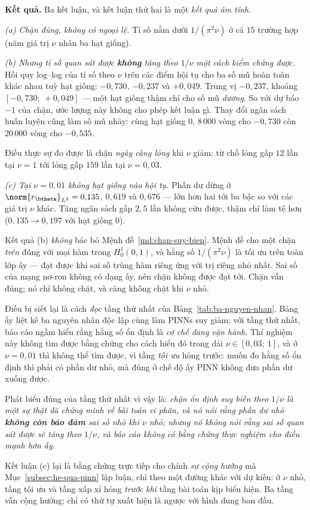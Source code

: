 \textbf{Kết quả.} Ba kết luận, và kết luận thứ hai là một \emph{kết quả âm tính}.

\emph{(a) Chặn đúng, không có ngoại lệ.} Tỉ số nằm dưới $1/(\pi^2\nu)$ ở cả
$15$ trường hợp (năm giá trị $\nu$ nhân ba hạt giống).

\emph{(b) Nhưng tỉ số quan sát được \textbf{không} tăng theo $1/\nu$ một cách
kiểm chứng được.} Hồi quy log--log của tỉ số theo $\nu$ trên các điểm hội tụ cho
ba số mũ hoàn toàn khác nhau tuỳ hạt giống: $-0{,}730$, $-0{,}237$ và
$+0{,}049$. Trung vị $-0{,}237$, khoảng $[-0{,}730;\ +0{,}049]$ --- một hạt
giống thậm chí cho số mũ \emph{dương}. So với dự báo $-1$ của chặn, ước lượng
này không cho phép kết luận gì. Thay đổi ngân sách huấn luyện cũng làm số mũ
nhảy: cùng hạt giống $0$, $8\,000$ vòng cho $-0{,}730$ còn $20\,000$ vòng cho
$-0{,}535$.

Điều thực sự đo được là chặn \emph{ngày càng lỏng} khi $\nu$ giảm: từ chỗ lỏng
gấp $12$ lần tại $\nu = 1$ tới lỏng gấp $159$ lần tại $\nu = 0{,}03$.

\emph{(c) Tại $\nu = 0{,}01$ không hạt giống nào hội tụ.} Phần dư dừng ở
$\norm{r_{\btheta}}_{L^2} = 0{,}135$, $0{,}619$ và $0{,}676$ --- lớn hơn hai tới
ba bậc so với các giá trị $\nu$ khác. Tăng ngân sách gấp $2{,}5$ lần không cứu
được, thậm chí làm tệ hơn ($0{,}135 \to 0{,}197$ với hạt giống $0$).

\begin{nhanxet}
\label{nx:doc-tn7}
Kết quả (b) \emph{không} bác bỏ Mệnh đề~\ref{md:chan-suy-bien}. Mệnh đề cho một
chặn \emph{trên} đúng với mọi hàm trong $H^1_0(0,1)$, và hằng số $1/(\pi^2\nu)$
là tối ưu trên toàn lớp ấy --- đạt được khi sai số trùng hàm riêng ứng với trị
riêng nhỏ nhất. Sai số của mạng nơ-ron không có dạng ấy, nên chặn không được đạt
tới. Chặn vẫn đúng; nó chỉ không chặt, và càng không chặt khi $\nu$ nhỏ.

Điều bị siết lại là cách \emph{đọc} tầng thứ nhất của
Bảng~\ref{tab:ba-nguyen-nhan}. Bảng ấy liệt kê ba nguyên nhân độc lập cùng làm
PINNs suy giảm; với tầng thứ nhất, báo cáo ngầm hiểu rằng hằng số ổn định là
\emph{cơ chế đang vận hành}. Thí nghiệm này không tìm được bằng chứng cho cách
hiểu đó trong dải $\nu \in [0{,}03;\ 1]$, và ở $\nu = 0{,}01$ thì không thể tìm
được, vì tầng \emph{tối ưu} hỏng trước: muốn đo hằng số ổn định thì phải có phần
dư nhỏ, mà đúng ở chế độ ấy PINN không đưa phần dư xuống được.

Phát biểu đúng của tầng thứ nhất vì vậy là: \emph{chặn ổn định suy biến theo
$1/\nu$ là một sự thật đã chứng minh về bài toán vi phân, và nó nói rằng phần dư
nhỏ \textbf{không còn bảo đảm} sai số nhỏ khi $\nu$ nhỏ; nhưng nó không nói
rằng sai số quan sát được sẽ tăng theo $1/\nu$, và báo cáo không có bằng chứng
thực nghiệm cho điều mạnh hơn ấy.}

Kết luận (c) lại là bằng chứng trực tiếp cho chính \emph{sự cộng hưởng} mà
Mục~\ref{subsec:he-qua-pinn} lập luận, chỉ theo một đường khác với dự kiến: ở
$\nu$ nhỏ, tầng tối ưu và tầng xấp xỉ hỏng \emph{trước khi} tầng bài toán kịp
biểu hiện. Ba tầng vẫn cộng hưởng; chỉ có thứ tự xuất hiện là ngược với hình
dung ban đầu.
\end{nhanxet}

